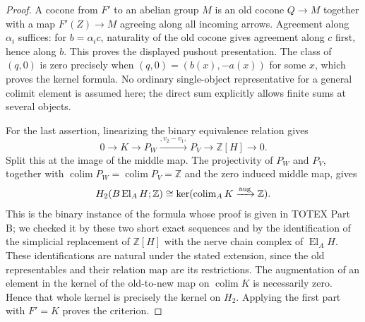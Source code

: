 \begin{proof}
A cocone from $F'$ to an abelian group $M$ is an old cocone
$Q\to M$ together with a map $F'(Z)\to M$ agreeing along all incoming
arrows. Agreement along $\alpha_i$ suffices: for
$b=\alpha_i c$, naturality of the old cocone gives agreement along
$c$ first, hence along $b$. This proves the displayed pushout
presentation. The class of $(q,0)$ is zero precisely when
$(q,0)=(b(x),-a(x))$ for some $x$, which proves the kernel formula.
No ordinary single-object representative for a general colimit element
is assumed here; the direct sum explicitly allows finite sums at
several objects.

For the last assertion, linearizing the binary equivalence relation
gives
\[
 0\longrightarrow K\longrightarrow P_W\xrightarrow{,v_2-v_1,}
 P_V\longrightarrow\mathbb Z[H]\longrightarrow0.
\]
Split this at the image of the middle map. The projectivity of $P_W$
and $P_V$, together with
$\operatorname{colim}P_W=\operatorname{colim}P_V=\mathbb Z$ and the
zero induced middle map, gives
\[
 H_2(B\operatorname{El}_A H;\mathbb Z)
 \cong\ker(\operatorname{colim}_A K\xrightarrow{\rm aug}\mathbb Z).
\]
This is the binary instance of the formula whose proof is given in
TOTEX Part B; we checked it by these two short exact sequences and by
the identification of the simplicial replacement of $\mathbb Z[H]$
with the nerve chain complex of $\operatorname{El}_A H$. These
identifications are natural under the stated extension, since the old
representables and their relation map are its restrictions. The
augmentation of an element in the kernel of the old-to-new map on
$\operatorname{colim}K$ is necessarily zero. Hence that whole kernel
is precisely the kernel on $H_2$. Applying the first part with
$F'=K$ proves the criterion.
\end{proof}

